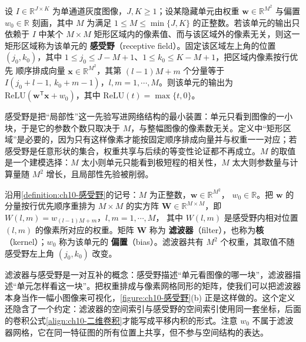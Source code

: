 \documentclass[../../main.tex]{subfiles}
\begin{document}
\begin{definition}[感受野]\label{definition:ch10-感受野}
设 $I\in\mathbb{R}^{J\times K}$ 为单通道灰度图像，$J,K\geqslant1$；设某隐藏单元由权重
$\mathbf{w}\in\mathbb{R}^{M^2}$ 与偏置 $w_0\in\mathbb{R}$ 刻画，其中 $M$ 为满足
$1\leqslant M\leqslant\min\{J,K\}$ 的正整数。若该单元的输出只依赖于 $I$ 中某个
$M\times M$ 矩形区域内的像素值、而与该区域外的像素无关，则这一矩形区域称为该单元的
\textbf{感受野}（receptive field）。固定该区域左上角的位置 $(j_0,k_0)$，其中
$1\leqslant j_0\leqslant J-M+1$、$1\leqslant k_0\leqslant K-M+1$，把区域内像素按行优先
顺序排成向量 $\mathbf{x}\in\mathbb{R}^{M^2}$，其第 $(l-1)M+m$ 个分量等于
$I(j_0+l-1,\,k_0+m-1)$，$l,m=1,\cdots,M$。则该单元的输出为
$\mathrm{ReLU}(\mathbf{w}^{\mathsf{T}}\mathbf{x}+w_0)$，其中
$\mathrm{ReLU}(t)=\max\{t,0\}$。
\end{definition}

\begin{remark}
感受野是把“局部性”这一先验写进网络结构的最小装置：单元只看到图像的一小块，于是它的参数个数只取决于 $M$，与整幅图像的像素数无关。定义中“矩形区域”是必要的，因为只有这样像素才能按固定顺序排成向量并与权重一一对应；若感受野是任意形状的集合，权重共享与后续的等变性论证都不再成立。$M$ 的取值是一个建模选择：$M$ 太小则单元只能看到极短程的相关性，$M$ 太大则参数量与计算量随 $M^2$ 增长，且局部性先验被削弱。
\end{remark}

\begin{definition}[滤波器与核]\label{definition:ch10-滤波器}
沿用\cref{definition:ch10-感受野}的记号：$M$ 为正整数，$\mathbf{w}\in\mathbb{R}^{M^2}$，
$w_0\in\mathbb{R}$。把 $\mathbf{w}$ 的分量按行优先顺序重排为 $M\times M$ 的实方阵
$\mathbf{W}\in\mathbb{R}^{M\times M}$，即 $W(l,m)=w_{(l-1)M+m}$，$l,m=1,\cdots,M$，
其中 $W(l,m)$ 是感受野内相对位置 $(l,m)$ 的像素所对应的权重。矩阵 $\mathbf{W}$ 称为
\textbf{滤波器}（filter），也称为\textbf{核}（kernel）；$w_0$ 称为该单元的
\textbf{偏置}（bias）。滤波器共有 $M^2$ 个权重，其取值不随感受野左上角
$(j_0,k_0)$ 改变。
\end{definition}

\begin{remark}
滤波器与感受野是一对互补的概念：感受野描述“单元看图像的哪一块”，滤波器描述“单元怎样看这一块”。把权重排成与像素网格同形的矩阵，使我们可以把滤波器本身当作一幅小图像来可视化，\cref{figure:ch10-感受野}(b) 正是这样做的。这个定义还隐含了一个约定：滤波器的空间索引与感受野的空间索引使用同一套坐标，后面的卷积公式\eqref{align:ch10-二维卷积}才能写成平移内积的形式。注意 $w_0$ 不属于滤波器网格，它在同一特征图的所有位置上共享，但不参与空间结构的表达。
\end{remark}
\end{document}
